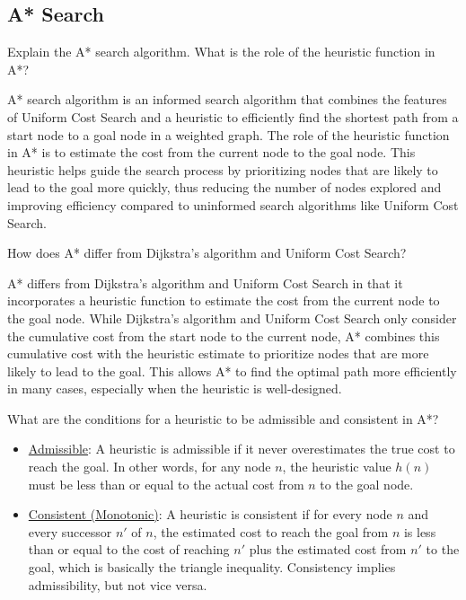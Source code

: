 \subsection*{A* Search}
\begin{ejercicio}
    Explain the A* search algorithm. What is the role of the heuristic function in A*?

    A* search algorithm is an informed search algorithm that combines the features of Uniform Cost Search and a heuristic to efficiently find the shortest path from a start node to a goal node in a weighted graph. The role of the heuristic function in A* is to estimate the cost from the current node to the goal node. This heuristic helps guide the search process by prioritizing nodes that are likely to lead to the goal more quickly, thus reducing the number of nodes explored and improving efficiency compared to uninformed search algorithms like Uniform Cost Search.
\end{ejercicio}
\begin{ejercicio}
    How does A* differ from Dijkstra's algorithm and Uniform Cost Search?

    A* differs from Dijkstra's algorithm and Uniform Cost Search in that it incorporates a heuristic function to estimate the cost from the current node to the goal node. While Dijkstra's algorithm and Uniform Cost Search only consider the cumulative cost from the start node to the current node, A* combines this cumulative cost with the heuristic estimate to prioritize nodes that are more likely to lead to the goal. This allows A* to find the optimal path more efficiently in many cases, especially when the heuristic is well-designed.
\end{ejercicio}
\begin{ejercicio}
    What are the conditions for a heuristic to be admissible and consistent in A*?
    \begin{itemize}
        \item \ul{Admissible}: A heuristic is admissible if it never overestimates the true cost to reach the goal. In other words, for any node $n$, the heuristic value $h(n)$ must be less than or equal to the actual cost from $n$ to the goal node.
        \item \ul{Consistent (Monotonic)}: A heuristic is consistent if for every node $n$ and every successor $n'$ of $n$, the estimated cost to reach the goal from $n$ is less than or equal to the cost of reaching $n'$ plus the estimated cost from $n'$ to the goal, which is basically the triangle inequality. Consistency implies admissibility, but not vice versa.
    \end{itemize}
\end{ejercicio}


